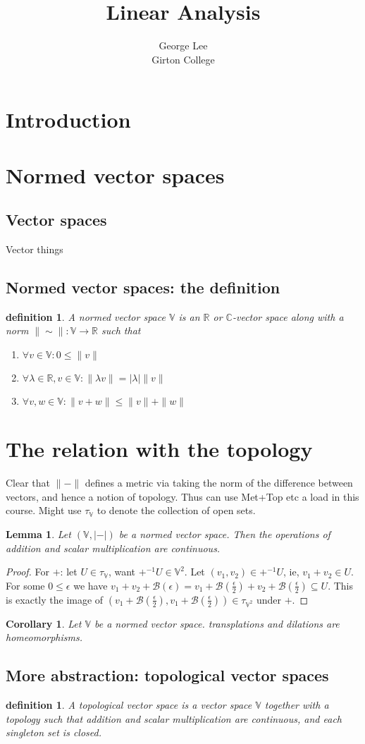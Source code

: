 \documentclass{article}
\title{Linear Analysis}
\author{George Lee\\Girton College}
\newtheorem{corollary}{Corollary}[theorem]
\newtheorem{lemma}[theorem]{Lemma}
\newtheorem{definition}[theorem]{definition}
\begin{document}
\maketitle
\section{Introduction}
\section{Normed vector spaces}
\subsection{Vector spaces}
Vector things
\subsection{Normed vector spaces: the definition}
\begin{definition}
  A normed vector space $\mathbb V$ is an $\mathbb R$ or $\mathbb C$-vector space along with a norm $\|\sim\|:\mathbb V \rightarrow \mathbb R$ such that
  \begin{enumerate}
    \item $\forall v\in\mathbb V :0\leq\|v\|$
    \item $\forall\lambda\in\mathbb R,v\in\mathbb V:\|\lambda v\|=|\lambda|\|v\|$
    \item $\forall v,w\in\mathbb V:\|v+w\|\leq\|v\|+\|w\|$
  \end{enumerate}
\end{definition}
\section{The relation with the topology}
Clear that $\|-\|$ defines a metric via taking the norm of the difference between vectors, and hence a notion of topology.  Thus can use Met+Top etc a load in this course.  Might use $\tau_\mathbb{V}$ to denote the collection of open sets.
\begin{lemma}
  Let $(\mathbb V,|-|)$ be a normed vector space.  Then the operations of addition and scalar multiplication are continuous.
\end{lemma}
\begin{proof}
  For $+$: let $U\in\tau_\mathbb V$, want $+^{-1}U\in\mathbb V^2$.  Let $(v_1,v_2)\in +^{-1}U$, ie, $v_1+v_2\in U$.  For some $0\leq\epsilon$ we have $v_1+v_2+\mathcal B(\epsilon)=v_1+\mathcal B(\frac{\epsilon}{2})+v_2+\mathcal B(\frac{\epsilon}{2})\subseteq U$.  This is exactly the image of $(v_1+\mathcal B(\frac{\epsilon}{2}),v_1+\mathcal B(\frac{\epsilon}{2}))\in\tau_{\mathbb V^2}$ under $+$.
\end{proof}
\begin{corollary}
  Let $\mathbb V$ be a normed vector space. transplations and dilations are homeomorphisms.
\end{corollary}
\subsection{More abstraction: topological vector spaces}
\begin{definition}
  A topological vector space is a vector space $\mathbb V$ together with a topology such that addition and scalar multiplication are continuous, and each singleton set is closed.
\end{definition}
\end{document}
